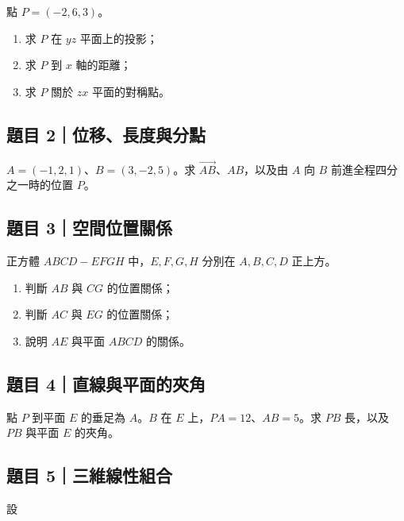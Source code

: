 \documentclass[11pt,a4paper]{article}
\providecommand{\tightlist}{%
  \setlength{\itemsep}{0pt}\setlength{\parskip}{0pt}}
\begin{document}
點 \(P=(-2,6,3)\)。

\begin{enumerate}
\def\labelenumi{\arabic{enumi}.}
\tightlist
\item
  求 \(P\) 在 \(yz\) 平面上的投影；
\item
  求 \(P\) 到 \(x\) 軸的距離；
\item
  求 \(P\) 關於 \(zx\) 平面的對稱點。
\end{enumerate}

\subsection{題目 2｜位移、長度與分點}\label{ux984cux76ee-2ux4f4dux79fbux9577ux5ea6ux8207ux5206ux9ede}

\(A=(-1,2,1)\)、\(B=(3,-2,5)\)。求 \(\overrightarrow{AB}\)、\(AB\)，以及由 \(A\) 向 \(B\) 前進全程四分之一時的位置 \(P\)。

\subsection{題目 3｜空間位置關係}\label{ux984cux76ee-3ux7a7aux9593ux4f4dux7f6eux95dcux4fc2}

正方體 \(ABCD-EFGH\) 中，\(E,F,G,H\) 分別在 \(A,B,C,D\) 正上方。

\begin{enumerate}
\def\labelenumi{\arabic{enumi}.}
\tightlist
\item
  判斷 \(AB\) 與 \(CG\) 的位置關係；
\item
  判斷 \(AC\) 與 \(EG\) 的位置關係；
\item
  說明 \(AE\) 與平面 \(ABCD\) 的關係。
\end{enumerate}

\subsection{題目 4｜直線與平面的夾角}\label{ux984cux76ee-4ux76f4ux7ddaux8207ux5e73ux9762ux7684ux593eux89d2}

點 \(P\) 到平面 \(E\) 的垂足為 \(A\)。\(B\) 在 \(E\) 上，\(PA=12\)、\(AB=5\)。求 \(PB\) 長，以及 \(PB\) 與平面 \(E\) 的夾角。

\subsection{題目 5｜三維線性組合}\label{ux984cux76ee-5ux4e09ux7dadux7ddaux6027ux7d44ux5408}

設
\end{document}
